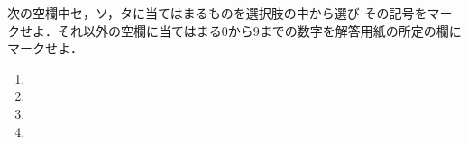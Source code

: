 \documentclass[../../../uem_mat_mei_q.tex]{subfiles}
\begin{document}
    次の空欄中\textsf{セ}，\textsf{ソ}，\textsf{タ}に当てはまるものを選択肢の中から選び%
    その記号をマークせよ．それ以外の空欄に当てはまる0から9までの数字を解答用紙の所定の欄に%
    マークせよ．
    
    \begin{enumerate}
        \item 
        \item 
        \item 
        \newpage
        \item 
    \end{enumerate}
\end{document}
